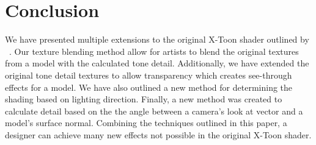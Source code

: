 \documentclass[annual]{acmsiggraph}
\begin{document}
\section{Conclusion}
\label{sec:conclusion}
We have presented multiple extensions to the original X-Toon shader outlined by ~\cite{BTM06a}. Our texture blending method allow for artists to blend the original textures from a model with the calculated tone detail. Additionally, we have extended the original tone detail textures to allow transparency which creates see-through effects for a model. We have also outlined a new method for determining the shading based on lighting direction. Finally, a new method was created to calculate detail based on the the angle between a camera's look at vector and a model's surface normal. Combining the techniques outlined in this paper, a designer can achieve many new effects not possible in the original X-Toon shader.



\end{document}
